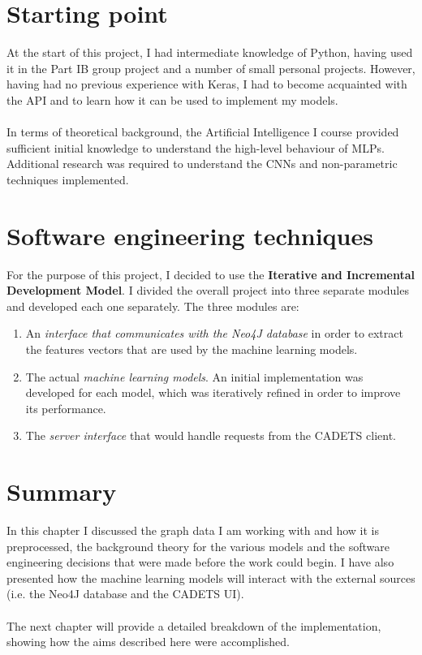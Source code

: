 	\section{Starting point} \label{Section 2.6}
	At the start of this project, I had intermediate knowledge of Python, having used it in the Part IB group project and a number of small personal projects. However, having had no previous experience with Keras, I had to become acquainted with the API and to learn how it can be used to implement my models.   
	\\ \\
	In terms of theoretical background, the Artificial Intelligence I course provided sufficient initial knowledge to understand the high-level behaviour of MLPs. Additional research was required to understand the CNNs and non-parametric techniques implemented.
	
	\section{Software engineering techniques} \label{Section 2.7}
	For the purpose of this project, I decided to use the \textbf{Iterative and Incremental Development Model}. I divided the overall project into three separate modules and developed each one separately. The three modules are:
	\begin{enumerate}
		\item An \textit{interface that communicates with the Neo4J database} in order to extract the features vectors that are used by the machine learning models.
		\item The actual \textit{machine learning models}. 	An initial implementation was developed for each model, which was iteratively refined in order to improve its performance.  
		\item The \textit{server interface} that would handle requests from the CADETS client.
	\end{enumerate}

	\section{Summary} \label{Section 2.8}
	In this chapter I discussed the graph data I am working with and how it is preprocessed, the background theory for the various models and the software engineering decisions that were made before the work could begin. I have also presented how the machine learning models will interact with the external sources (i.e. the Neo4J database and the CADETS UI).
	\\ \\
	The next chapter will provide a detailed breakdown of the implementation, showing how the aims described here were accomplished. 
	
